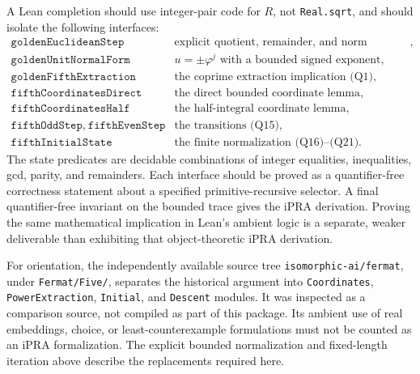 A Lean completion should use integer-pair code for \(R\), not
\texttt{Real.sqrt}, and should isolate the following interfaces:
\[
\begin{array}{ll}
\texttt{goldenEuclideanStep}&
  \text{explicit quotient, remainder, and norm decrease},\\
\texttt{goldenUnitNormalForm}&
  u=\pm\varphi^j\text{ with a bounded signed exponent},\\
\texttt{goldenFifthExtraction}&
  \text{the coprime extraction implication (Q1)},\\
\texttt{fifthCoordinatesDirect}&
  \text{the direct bounded coordinate lemma},\\
\texttt{fifthCoordinatesHalf}&
  \text{the half-integral coordinate lemma},\\
\texttt{fifthOddStep},\ \texttt{fifthEvenStep}&
  \text{the transitions (Q15)},\\
\texttt{fifthInitialState}&
  \text{the finite normalization (Q16)--(Q21)}.
\end{array}
\]
The state predicates are decidable combinations of integer equalities,
inequalities, gcd, parity, and remainders.
Each interface should be proved as a quantifier-free correctness
statement about a specified primitive-recursive selector.
A final quantifier-free invariant on the bounded trace gives the iPRA
derivation.  Proving the same mathematical implication in Lean's
ambient logic is a separate, weaker deliverable than exhibiting that
object-theoretic iPRA derivation.

For orientation, the independently available source tree
\texttt{isomorphic-ai/fermat}, under
\texttt{Fermat/Five/}, separates the historical argument into
\texttt{Coordinates}, \texttt{PowerExtraction}, \texttt{Initial}, and
\texttt{Descent} modules.  It was inspected as a comparison source,
not compiled as part of this package.  Its ambient use of real embeddings,
choice, or least-counterexample formulations must not be counted as
an iPRA formalization.  The explicit bounded normalization and fixed-length
iteration above describe the replacements required here.

